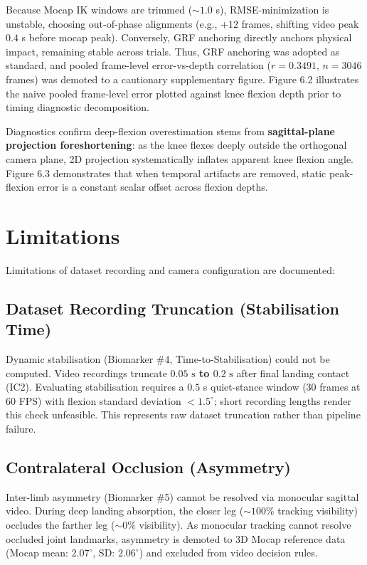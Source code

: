 Because Mocap IK windows are trimmed ($\sim 1.0$ s), RMSE-minimization is unstable, choosing out-of-phase alignments (e.g., $+12$ frames, shifting video peak $0.4$ s before mocap peak). Conversely, GRF anchoring directly anchors physical impact, remaining stable across trials. Thus, GRF anchoring was adopted as standard, and pooled frame-level error-vs-depth correlation ($r = 0.3491$, $n = 3046$ frames) was demoted to a cautionary supplementary figure.
Figure 6.2 illustrates the naive pooled frame-level error plotted against knee flexion depth prior to timing diagnostic decomposition.

Diagnostics confirm deep-flexion overestimation stems from \textbf{sagittal-plane projection foreshortening}: as the knee flexes deeply outside the orthogonal camera plane, 2D projection systematically inflates apparent knee flexion angle.
Figure 6.3 demonstrates that when temporal artifacts are removed, static peak-flexion error is a constant scalar offset across flexion depths.



\section{Limitations}
\label{sec:6-6-limitations}


Limitations of dataset recording and camera configuration are documented:

\subsection{Dataset Recording Truncation (Stabilisation Time)}
\label{sec:6-6-1-dataset-recording-truncation-stabilisation-time}

Dynamic stabilisation (Biomarker \protect\#4, Time-to-Stabilisation) could not be computed. Video recordings truncate \textbf{$0.05\text{ s}$ to $0.2\text{ s}$} after final landing contact (IC2). Evaluating stabilisation requires a $0.5$ s quiet-stance window (30 frames at 60 FPS) with flexion standard deviation $< 1.5^\circ$; short recording lengths render this check unfeasible. This represents raw dataset truncation rather than pipeline failure.

\subsection{Contralateral Occlusion (Asymmetry)}
\label{sec:6-6-2-contralateral-occlusion-asymmetry}

Inter-limb asymmetry (Biomarker \protect\#5) cannot be resolved via monocular sagittal video. During deep landing absorption, the closer leg ($\sim 100\%$ tracking visibility) occludes the farther leg ($\sim 0\%$ visibility). As monocular tracking cannot resolve occluded joint landmarks, asymmetry is demoted to 3D Mocap reference data (Mocap mean: $2.07^\circ$, SD: $2.06^\circ$) and excluded from video decision rules.

